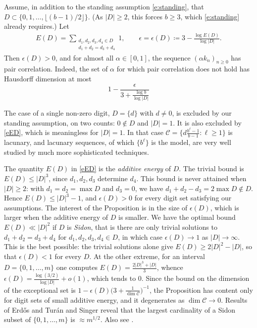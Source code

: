  \begin{proposition} \label{p:pairCorrelation} 
 Assume, in addition to the standing assumption \eqref{e:standing}, that $D\subset \{0 , 1, \ldots, \lfloor (b-1)/2\rfloor \}$. 
 (As $\lvert D\rvert \geq 2$, this forces $b\geq 3$, which \eqref{e:standing} already requires.) 
 Let 
 \begin{align} \label{eED}
    E(D) = \sum_{\substack{d_1,d_2,d_3,d_4\in D \\ d_1+d_2=d_3+d_4}} 1 , 
    \qquad 
    \epsilon = \epsilon(D) \coloneqq 3 - \frac{\log E(D)}{\log \lvert D\rvert}. 
 \end{align}
 Then $\epsilon(D) >0$, and for almost all $\alpha \in [0,1]$, 
 the sequence $(\alpha k_n)_{n\geq 0}$ has pair correlation.  
 Indeed, the set of $\alpha $ for which pair correlation does not hold has Hausdorff dimension 
 at most 
 \begin{equation}
     1 - \frac{\epsilon}{ 3 + \frac{\log b}{\log \lvert D\rvert }} 
 \end{equation}
  \end{proposition}

The case of a single non-zero digit, $D=\{d\}$ with $d\neq 0$, is excluded by our standing assumption, on two counts: $0\notin D$ and $\lvert D\rvert =1$. 
It is also excluded by \eqref{eED}, which is meaningless for $\lvert D\rvert=1$. 
In that case $\mathcal C=\{d\frac{b^{\ell}-1}{b-1}\colon \ell \geq 1\}$ is lacunary, and lacunary sequences, of which $\{b^\ell\}$ is the model, are very well studied \cites{MR1924774,MR3314206,MR4164447} by much more sophisticated techniques.  

  
The quantity $E(D)$ in \eqref{eED} is the \emph{additive energy}  of $D$.  The trivial bound is $E(D)\leq \lvert D \rvert ^{3}$, 
 since $d_1,d_2,d_3$ determine $d_4$. 
 This bound is never attained when $\lvert D\rvert\geq 2$: with $d_1=d_2=\max D$ and $d_3=0$, we have $d_1+d_2-d_3=2\max D\notin D$. 
 Hence $E(D)\leq \lvert D\rvert^3-1$, and $\epsilon(D)>0$ for every digit set satisfying our assumptions. 
 The interest of the Proposition is in the size of $\epsilon(D)$, which is larger when the additive energy of $D$ is smaller. 
We have the optimal bound $E(D) \ll \lvert D\rvert ^2$ if $D$ is \emph{Sidon}, that is there are only trivial solutions to $d_1+d_2=d_3+d_4$ for $d_1,d_2,d_3,d_4\in D$, in which case $\epsilon(D)\to 1$ as $\lvert D\rvert\to\infty$. 
This is the best possible: the trivial solutions alone give $E(D)\geq 2\lvert D\rvert ^2-\lvert D\rvert$, so that $\epsilon (D)<1$ for every $D$. 
At the other extreme, for an interval $D=\{0,1,\ldots ,m\}$ one computes $E(D)=\frac {2\lvert D\rvert ^3+\lvert D\rvert }3$, whence $\epsilon (D)=\frac{\log (3/2)}{\log \lvert D\rvert }+o(1)$, which tends to $0$. 
Since the bound on the dimension of the exceptional set is $1-\epsilon (D)\bigl(3+\frac{1}{\dim \mathcal C}\bigr)^{-1}$, the Proposition has content only for digit sets of small additive energy, and it degenerates as $\dim \mathcal C\to 0$. 
Results of Erd{\H o}s and Tur\'an \cite{MR6197} and Singer \cite{MR1501951}
 reveal that the largest cardinality of a Sidon subset of $\{0,1,\ldots,m\}$ is   $\approx m^{1/2}$.  
Also see \cite{MR4336213}. 


